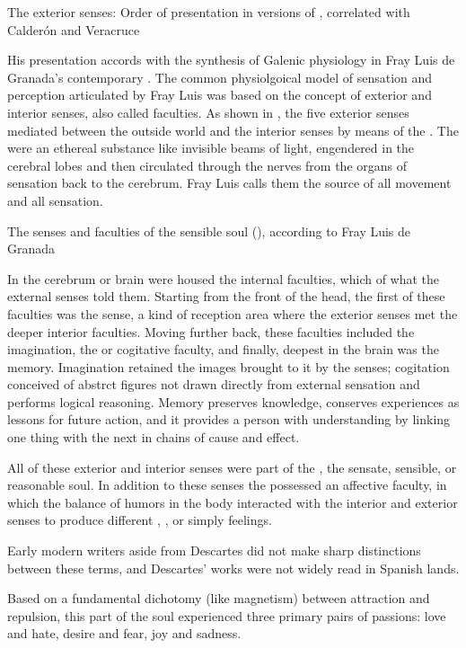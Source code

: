\begin{table}
\caption{The exterior senses: Order of presentation in versions of , correlated with Calderón and Veracruce}
\label{table:senses-order}
\end{table}

His presentation accords with the synthesis of Galenic physiology in Fray Luis de Granada's contemporary .%
  \autocite[\XXX]{LuisdeGranada:Simbolo}
The common physiolgoical model of sensation and perception articulated by Fray Luis was based on the concept of exterior and interior senses, also called faculties.
As shown in , the five exterior senses mediated between the outside world and the interior senses by means of the .
The  were an ethereal substance like invisible beams of light, engendered in the cerebral lobes and then circulated through the nerves from the organs of sensation back to the cerebrum.
Fray Luis calls them the source of all movement and all sensation.


\begin{landscapetable}
\caption{The senses and faculties of the sensible soul (), according to Fray Luis de Granada}
\label{table:senses-fray-luis}
\end{landscapetable}

In the cerebrum or brain were housed the internal faculties, which  of what the external senses told them.
Starting from the front of the head, the first of these faculties was the  sense, a kind of reception area where the exterior senses met the deeper interior faculties.
Moving further back, these faculties included the imagination, the  or cogitative faculty, and finally, deepest in the brain was the memory.
Imagination retained the images brought to it by the senses; cogitation conceived of abstrct figures not drawn directly from external sensation and performs logical reasoning.
Memory preserves knowledge, conserves experiences as lessons for future action, and it provides a person with understanding by linking one thing with the next in chains of cause and effect.\XXX{}

All of these exterior and interior senses were part of the , the sensate, sensible, or reasonable soul.
In addition to these senses the  possessed an affective faculty, in which the balance of humors in the body interacted with the interior and exterior senses to produce different , , or simply feelings.
  \begin{Footnote}
  Early modern writers aside from Descartes did not make sharp distinctions between these terms, and Descartes' works were not widely read in Spanish lands.\XXX{}
  \end{Footnote}
Based on a fundamental dichotomy (like magnetism) between attraction and repulsion, this  part of the soul experienced three primary pairs of passions: love and hate, desire and fear, joy and sadness.

